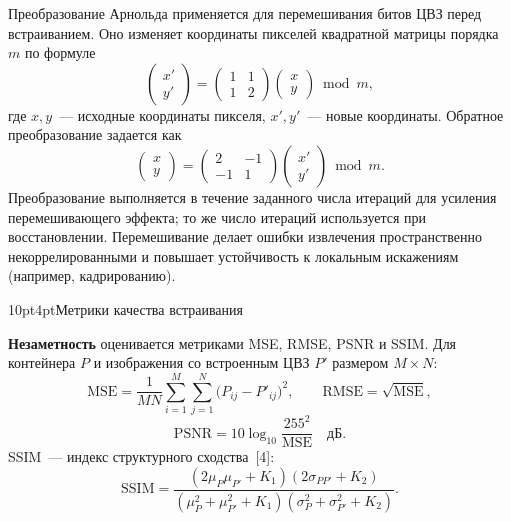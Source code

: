 \documentclass[12pt,a4paper]{article}
\makeatletter
\renewcommand\subsection{\@startsection{subsection}{2}{\z@}%
  {10pt}{4pt}{\normalfont\normalsize\bfseries}}
\makeatother
\begin{document}
Преобразование Арнольда применяется для перемешивания битов ЦВЗ перед встраиванием. Оно изменяет координаты пикселей квадратной матрицы порядка $m$ по формуле
\begin{equation}
    \begin{pmatrix} x' \\ y' \end{pmatrix} =
    \begin{pmatrix} 1 & 1 \\ 1 & 2 \end{pmatrix}
    \begin{pmatrix} x \\ y \end{pmatrix} \bmod m,
\end{equation}
где $x, y$~--- исходные координаты пикселя, $x', y'$~--- новые координаты. Обратное преобразование задается как
\begin{equation}
    \begin{pmatrix} x \\ y \end{pmatrix} =
    \begin{pmatrix} 2 & -1 \\ -1 & 1 \end{pmatrix}
    \begin{pmatrix} x' \\ y' \end{pmatrix} \bmod m.
\end{equation}
Преобразование выполняется в течение заданного числа итераций для усиления перемешивающего эффекта; то же число итераций используется при восстановлении. Перемешивание делает ошибки извлечения пространственно некоррелированными и повышает устойчивость к локальным искажениям (например, кадрированию).

\subsection{Метрики качества встраивания}

\textbf{Незаметность} оценивается метриками MSE, RMSE, PSNR и SSIM. Для контейнера $P$ и изображения со встроенным ЦВЗ $P'$ размером $M \times N$:
\begin{equation}
    \mathrm{MSE} = \frac{1}{MN}\sum_{i=1}^{M}\sum_{j=1}^{N}\bigl(P_{ij} - P'_{ij}\bigr)^2, \qquad \mathrm{RMSE} = \sqrt{\mathrm{MSE}},
\end{equation}
\begin{equation}
    \mathrm{PSNR} = 10\log_{10}\frac{255^2}{\mathrm{MSE}}\quad\text{дБ}.
\end{equation}
SSIM~--- индекс структурного сходства~[4]:
\begin{equation}
    \mathrm{SSIM} = \frac{(2\mu_P\mu_{P'} + K_1)(2\sigma_{PP'} + K_2)}{(\mu_P^2 + \mu_{P'}^2 + K_1)(\sigma_P^2 + \sigma_{P'}^2 + K_2)}.
\end{equation}
\end{document}
